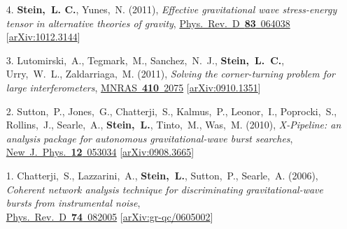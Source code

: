 \begin{enumerate}
{    black holes in alternative theories of gravity},
  \href{http://dx.doi.org/10.1103/PhysRevD.83.104002}{Phys.~Rev.~D~{\bf 83}~104002}
  [\href{http://arxiv.org/abs/1101.2921}{arXiv:1101.2921}]
\item[{4.}] {\bf Stein,~L. C.}, Yunes,~N. (2011), {\it Effective
    gravitational wave stress-energy tensor in alternative theories of
    gravity},
  \href{http://dx.doi.org/10.1103/PhysRevD.83.064038}{Phys.~Rev.~D~{\bf 83}~064038}
  [\href{http://arxiv.org/abs/1012.3144}{arXiv:1012.3144}]
\item[{3.}] Lutomirski,~A., Tegmark,~M., Sanchez,~N.~J., {\bf
    Stein,~L.~C.},
  Urry,~W.~L., Zaldarriaga,~M. (2011), {\it Solving the
    corner-turning problem for large interferometers},
  \href{http://dx.doi.org/10.1111/j.1365-2966.2010.17587.x}{MNRAS~{\bf 410}~2075}
  [\href{http://arxiv.org/abs/0910.1351}{arXiv:0910.1351}]
\item[{2.}] Sutton,~P., Jones,~G., Chatterji,~S., Kalmus,~P., Leonor,~I.,
  Poprocki,~S., Rollins,~J., Searle,~A., {\bf Stein,~L.}, Tinto,~M.,
  Was,~M. (2010), {\it X-Pipeline: an analysis package for autonomous
    gravitational-wave burst searches},
  \href{http://dx.doi.org/10.1088/1367-2630/12/5/053034}{New~J.~Phys.~{\bf 12}~053034}
  [\href{http://arxiv.org/abs/0908.3665}{arXiv:0908.3665}]
\item[{1.}] Chatterji,~S., Lazzarini,~A., {\bf Stein,~L.}, Sutton,~P.,
  Searle,~A. (2006), {\it Coherent network analysis technique for
    discriminating gravitational-wave bursts from instrumental noise},\\
  \href{http://dx.doi.org/10.1103/PhysRevD.74.082005}{Phys.~Rev.~D~{\bf 74}~082005}
  [\href{http://arxiv.org/abs/gr-qc/0605002}{arXiv:gr-qc/0605002}]
\end{enumerate}

